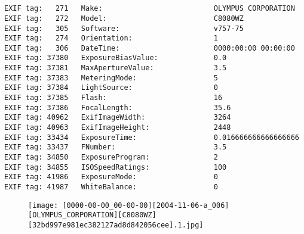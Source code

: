 \section{\protect{}}
\noindent 
\noindent
\begin{lstlisting}
EXIF tag:   271   Make:                          OLYMPUS CORPORATION
EXIF tag:   272   Model:                         C8080WZ
EXIF tag:   305   Software:                      v757-75
EXIF tag:   274   Orientation:                   1
EXIF tag:   306   DateTime:                      0000:00:00 00:00:00
EXIF tag: 37380   ExposureBiasValue:             0.0
EXIF tag: 37381   MaxApertureValue:              3.5
EXIF tag: 37383   MeteringMode:                  5
EXIF tag: 37384   LightSource:                   0
EXIF tag: 37385   Flash:                         16
EXIF tag: 37386   FocalLength:                   35.6
EXIF tag: 40962   ExifImageWidth:                3264
EXIF tag: 40963   ExifImageHeight:               2448
EXIF tag: 33434   ExposureTime:                  0.016666666666666666
EXIF tag: 33437   FNumber:                       3.5
EXIF tag: 34850   ExposureProgram:               2
EXIF tag: 34855   ISOSpeedRatings:               100
EXIF tag: 41986   ExposureMode:                  0
EXIF tag: 41987   WhiteBalance:                  0

\end{lstlisting}
\clearpage
\begin{figure}
\raggedleft
\texttt{[image: [0000-00-00\_00-00-00][2004-11-06-a\_006][OLYMPUS\_CORPORATION][C8080WZ][32bd997e981ec382127ad8d842056cee].1.jpg]}
\end{figure}


\clearpage
